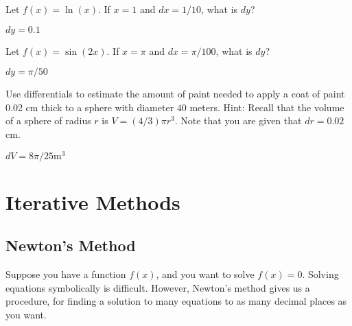 \begin{exercises}
\begin{exercise} 
Let $f(x) = \ln(x)$. If $x=1$ and $dx =1/10$, what is $dy$?
\begin{answer} $dy=0.1$
\end{answer}\end{exercise}


\begin{exercise} 
Let $f(x) = \sin (2x)$. If $x=\pi$ and $dx=\pi/100$, what is $dy$?
\begin{answer} $dy=\pi/50$
\end{answer}\end{exercise}

\begin{exercise} Use differentials to estimate the amount of paint needed to
 apply a coat of paint 0.02 cm thick to a sphere with diameter $40$
 meters. Hint: Recall that the volume of a sphere of radius $r$ is $V
 =(4/3)\pi r^3$. Note that you are given that $dr=0.02$ cm.
\begin{answer} $dV=8\pi/25 \text{m}^3$
\end{answer}\end{exercise}

\end{exercises}












\section{Iterative Methods}

\subsection*{Newton's Method}

Suppose you have a function $f(x)$, and you want to solve $f(x)=0$.
Solving equations symbolically is difficult. However, Newton's method
gives us a procedure, for finding a solution to many equations to as
many decimal places as you want.  


